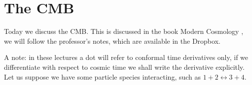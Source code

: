 \documentclass[main.tex]{subfiles}
\begin{document}
\chapter{The CMB}


Today we discuss the CMB. 
This is discussed in the book Modern Cosmology \cite[chapter 3]{dodelsonModernCosmology2003}, we will follow the professor's notes, which are available in the Dropbox.

A note: in these lectures a dot will refer to conformal time derivatives only, if we differentiate with respect to cosmic time we shall write the derivative explicitly.
Let us suppose we have some particle species interacting, such as \(1 + 2 \leftrightarrow 3 +4\). 
\end{document}
